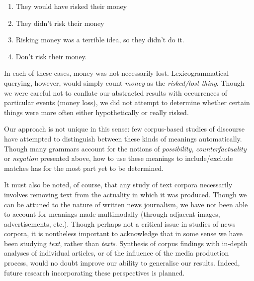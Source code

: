         \begin{enumerate} [before=\itshape,font=\normalfont] \setlength\itemsep{0em} \small
            \item They would have risked their money
            \item They didn't risk their money
            \item Risking money was a terrible idea, so they didn't do it.
            \item Don't risk their money.
        \end{enumerate}
        In each of these cases, money was not necessarily lost. Lexicogrammatical querying, however, would simply count \emph{money} as the \emph{risked\slash lost thing}. Though we were careful not to conflate our abstracted results with occurrences of particular events (money loss), we did not attempt to determine whether certain things were more often either hypothetically or really risked.

        Our approach is not unique in this sense: few corpus-based studies of discourse have attempted to distinguish between these kinds of meanings automatically. Though many grammars account for the notions of \emph{possibility}, \emph{counterfactuality} or \emph{negation} presented above, how to use these meanings to include\slash exclude matches has for the most part yet to be determined.

        It must also be noted, of course, that any study of text corpora necessarily involves removing text from the actuality in which it was produced. Though we can be attuned to the nature of written news journalism, we have not been able to account for meanings made multimodally (through adjacent images, advertisements, etc.). Though perhaps not a critical issue in studies of news corpora, it is nontheless important to acknowledge that in some sense we have been studying \emph{text}, rather than \emph{texts}. Synthesis of corpus findings with in-depth analyses of individual articles, or of the influence of the media production process, would no doubt improve our ability to generalise our results. Indeed, future research incorporating these perspectives is planned.

